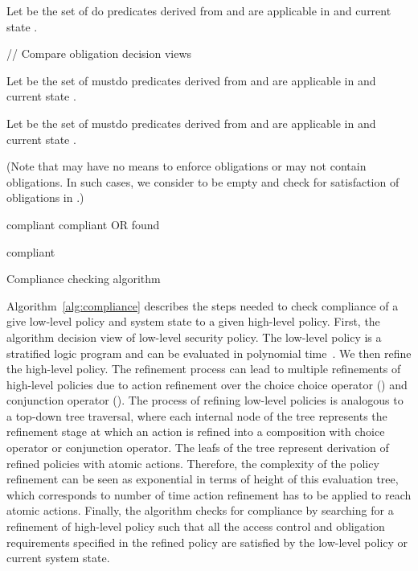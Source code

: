 \documentclass[12pt,journal,letterpaper,onecolumn]{IEEEtran}
\begin{document}
\begin{algorithm}[!hb]
{    Let  be the set of {\ttfamily do} predicates derived from \LLP
    and are applicable in \DataSystem and current state \State. \;




    \BlankLine

    // Compare obligation decision views \;

    Let  be the set of {\ttfamily mustdo} predicates derived from \HLP
    and are applicable in \DataSystem and current state \State. \;

    Let  be the set of {\ttfamily mustdo} predicates derived from \LLP
    and are applicable in \DataSystem and current state \State. \;

    (Note that \LLP may have no means to enforce obligations or \LLP may not
      contain obligations. In such cases, we consider  to be empty and check
      for satisfaction of obligations in .) \;


    compliant  compliant OR found \;

}

\Return compliant \;

\caption{Compliance checking algorithm} 
\label{alg:compliance}
\end{algorithm}

Algorithm~\ref{alg:compliance} describes the steps needed to 
check compliance of a give low-level policy and system state
to a given high-level policy. 
First, the algorithm decision view of low-level security policy. 
The low-level policy is a stratified logic program and can be 
evaluated in polynomial time~\cite{Jajodia01}. We then refine the 
high-level policy. The refinement process can lead to multiple
refinements of high-level policies due to action refinement over
the choice choice operator () and conjunction operator 
(). The process of refining low-level policies is analogous 
to a top-down tree traversal, where each internal node of the tree
represents the refinement stage at which an action is refined into a 
composition with choice operator or conjunction operator. The leafs 
of the tree represent derivation of refined policies with atomic actions.
Therefore, the complexity of the policy refinement can be seen
as exponential in terms of height of this evaluation tree, which 
corresponds to number of time action refinement has to be 
applied to reach atomic actions. Finally, the algorithm checks for
compliance by searching for a refinement of high-level policy such 
that all the access control and obligation requirements
specified in the refined policy are satisfied
by the low-level policy or current system state. 
\end{document}
